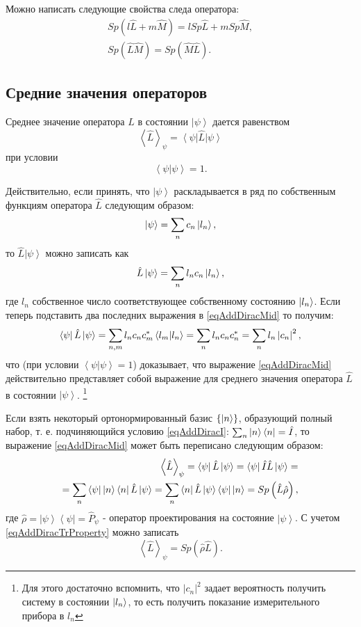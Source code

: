 Можно написать следующие свойства следа оператора:
\begin{eqnarray}
Sp\left(l \hat{L} + m \hat{M}\right) = 
l Sp \hat{L} + m Sp \hat{M},
\nonumber \\
Sp\left(\hat{L}\hat{M}\right) = 
Sp\left(\hat{M}\hat{L}\right).
\label{eqAddDiracTrProperty}
\end{eqnarray}

\subsection{Средние  значения  операторов}
Среднее значение оператора $\hat{L}$   в состоянии $\left| \psi
\right>$  дается равенством 
\begin{equation}  
\left< \hat{L} \right>_{\psi} = \left<\psi\right|\hat{L}\left|\psi\right>
\label{eqAddDiracMid}
\end{equation}  
при условии
\[
\left<\psi\right.\left|\psi\right> = 1.
\]

Действительно, если принять, что $\left|\psi\right>$ раскладывается в
ряд по собственным функциям оператора $\hat{L}$ следующим образом:
\[
\left|\psi\right> = \sum_n c_n \ket{l_n},
\]
то $\hat{L}\left|\psi\right>$ можно записать как
\[
\hat{L}\left|\psi\right> = \sum_n l_n c_n \ket{l_n},
\]
где $l_n$ собственное число соответствующее собственному состоянию 
$\ket{l_n}$. 
Если теперь подставить два последних выражения в \eqref{eqAddDiracMid}
то получим:
\[
\left<\psi\right|\hat{L}\left|\psi\right> = \sum_{n,m} 
l_n c_n c_m^{*} \bra{l_m} \ket{l_n}=
\sum_n l_n c_n c_n^{*} = 
\sum_n l_n \left|c_n\right|^2, 
\]
что (при условии $\left<\psi\right.\left|\psi\right> = 1$) доказывает,
что выражение \eqref{eqAddDiracMid} действительно 
представляет собой выражение для среднего значения оператора 
$\hat{L}$   в состоянии $\left|\psi\right>$.
\footnote{Для этого достаточно вспомнить, что $\left|c_n\right|^2$
  задает вероятность получить систему в состоянии $\ket{l_n}$,
  то есть получить показание измерительного прибора в $l_n$}

Если взять некоторый ортонормированный базис $\{\ket{ n }\}$,
образующий полный набор, т. е. подчиняющийся условию
\eqref{eqAddDiracI}: $\sum_n \ket{ n }\bra{ n } =
\hat{I}$, то выражение \eqref{eqAddDiracMid}
может быть переписано следующим образом:
\begin{eqnarray}
\left< \hat{L} \right>_{\psi} = 
\left<\psi\right|\hat{L}\left|\psi\right> = 
\left<\psi\right|\hat{I}\hat{L}\left|\psi\right> = 
\nonumber \\
= 
\sum_n \left<\psi\right|\ket{n}\bra{n}
\hat{L}\left|\psi\right> = 
\sum_n \bra{n}
\hat{L}\left|\psi\right>\left<\psi\right|\ket{n} = 
Sp \left(\hat{L} \hat{\rho} \right),
\nonumber
\end{eqnarray}
где 
\(
\hat{\rho} = \left|\psi\right>\left<\psi\right| = \hat{P}_{\psi}
\) - оператор проектирования на состояние 
$\left| \psi \right>$.
С учетом \eqref{eqAddDiracTrProperty} можно записать
\begin{equation}
\left< \hat{L} \right>_{\psi} = Sp \left(\hat{\rho} \hat{L} \right).
\label{eqAddDiracMidViaRho}
\end{equation}

